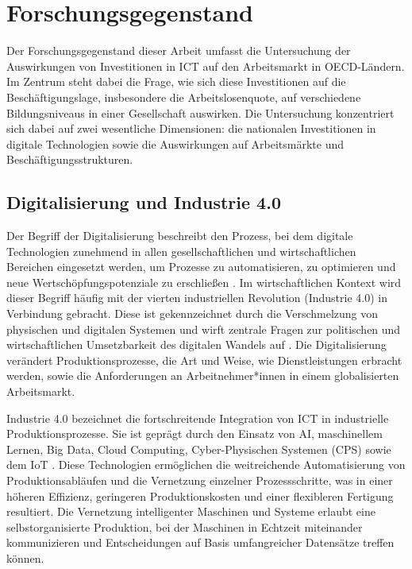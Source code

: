 
\section{Forschungsgegenstand}

Der Forschungsgegenstand dieser Arbeit umfasst die Untersuchung der Auswirkungen von 
Investitionen in \ac{ICT} auf den Arbeitsmarkt in \ac{OECD}-Ländern. Im Zentrum steht 
dabei die Frage, wie sich diese Investitionen auf die Beschäftigungslage, insbesondere die 
Arbeitslosenquote, auf verschiedene Bildungsniveaus in einer Gesellschaft auswirken. Die 
Untersuchung konzentriert sich dabei auf zwei wesentliche Dimensionen: die nationalen 
Investitionen in digitale Technologien sowie die Auswirkungen auf Arbeitsmärkte und 
Beschäftigungsstrukturen.


\subsection{Digitalisierung und Industrie 4.0}

Der Begriff der Digitalisierung beschreibt den Prozess, bei dem digitale Technologien 
zunehmend in allen gesellschaftlichen und wirtschaftlichen Bereichen eingesetzt werden, um 
Prozesse zu automatisieren, zu optimieren und neue Wertschöpfungspotenziale zu erschließen 
\parencite[S. 6]{brennen2016theinternational}. Im wirtschaftlichen Kontext wird dieser 
Begriff häufig mit der vierten industriellen Revolution (Industrie 4.0) in Verbindung 
gebracht. Diese ist gekennzeichnet durch die Verschmelzung von physischen und digitalen 
Systemen und wirft zentrale Fragen zur politischen und wirtschaftlichen Umsetzbarkeit des 
digitalen Wandels auf \parencite[S. 114]{hofman2018arbeit}. Die Digitalisierung verändert 
Produktionsprozesse, die Art und Weise, wie Dienstleistungen erbracht werden, sowie die 
Anforderungen an Arbeitnehmer*innen in einem globalisierten Arbeitsmarkt.

Industrie 4.0 bezeichnet die fortschreitende Integration von \ac{ICT} in industrielle 
Produktionsprozesse. Sie ist geprägt durch den Einsatz von \ac{AI}, maschinellem Lernen, 
Big Data, Cloud Computing, Cyber-Physischen Systemen (CPS) sowie dem \ac{IoT} 
\parencite[S. 22]{kagermann2013recommendations}. Diese Technologien ermöglichen die 
weitreichende Automatisierung von Produktionsabläufen und die Vernetzung einzelner 
Prozessschritte, was in einer höheren Effizienz, geringeren Produktionskosten und einer 
flexibleren Fertigung resultiert. Die Vernetzung intelligenter Maschinen und Systeme 
erlaubt eine selbstorganisierte Produktion, bei der Maschinen in Echtzeit miteinander 
kommunizieren und Entscheidungen auf Basis umfangreicher Datensätze treffen können.

